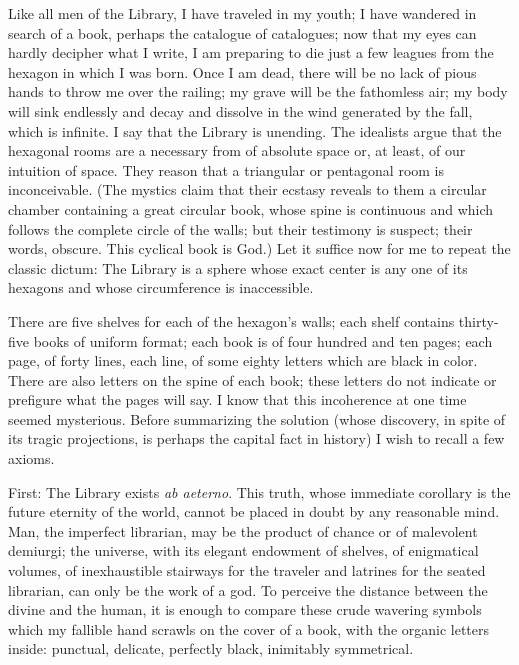 \documentclass[10pt,twoside,openright]{memoir}
\begin{document}
Like all men of the Library, I have traveled in my youth; I have wandered in search of a book, perhaps the catalogue of catalogues; now that my eyes can hardly decipher what I write, I am preparing to die just a few leagues from the hexagon in which I was born. Once I am dead, there will be no lack of pious hands to throw me over the railing; my grave will be the fathomless air; my body will sink endlessly and decay and dissolve in the wind generated by the fall, which is infinite. I say that the Library is unending. The idealists argue that the hexagonal rooms are a necessary from of absolute space or, at least, of our intuition of space. They reason that a triangular or pentagonal room is inconceivable. (The mystics claim that their ecstasy reveals to them a circular chamber containing a great circular book, whose spine is continuous and which follows the complete circle of the walls; but their testimony is suspect; their words, obscure. This cyclical book is God.) Let it suffice now for me to repeat the classic dictum: The Library is a sphere whose exact center is any one of its hexagons and whose circumference is inaccessible.

There are five shelves for each of the hexagon's walls; each shelf contains thirty-five books of uniform format; each book is of four hundred and ten pages; each page, of forty lines, each line, of some eighty letters which are black in color. There are also letters on the spine of each book; these letters do not indicate or prefigure what the pages will say. I know that this incoherence at one time seemed mysterious. Before summarizing the solution (whose discovery, in spite of its tragic projections, is perhaps the capital fact in history) I wish to recall a few axioms.

First: The Library exists \emph{ab aeterno}. This truth, whose immediate corollary is the future eternity of the world, cannot be placed in doubt by any reasonable mind. Man, the imperfect librarian, may be the product of chance or of malevolent demiurgi; the universe, with its elegant endowment of shelves, of enigmatical volumes, of inexhaustible stairways for the traveler and latrines for the seated librarian, can only be the work of a god. To perceive the distance between the divine and the human, it is enough to compare these crude wavering symbols which my fallible hand scrawls on the cover of a book, with the organic letters inside: punctual, delicate, perfectly black, inimitably symmetrical.
\end{document}
